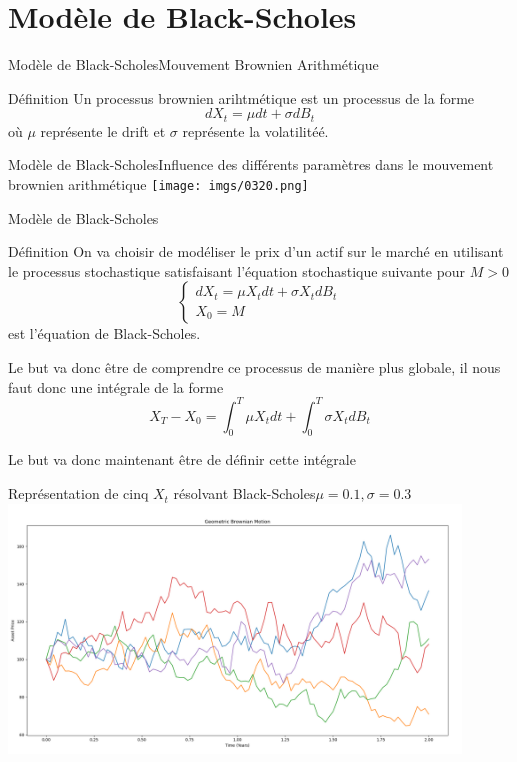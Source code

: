 \documentclass{beamer}
\newcommand{\1}{\mathmybb{1}}
\begin{document}
\section{Modèle de Black-Scholes}
\begin{frame}{Modèle de Black-Scholes}{Mouvement Brownien Arithmétique}
  \begin{block}{Définition}
    Un processus brownien arihtmétique est un processus de la forme
    \begin{equation}
      dX_{t} = \mu dt + \sigma dB_{t}
    \end{equation}
    où $\mu$ représente le drift et $\sigma$ représente la volatilitéé.
    \end{block}
  \end{frame}
  \begin{frame}{Modèle de Black-Scholes}{Influence des différents paramètres dans le mouvement brownien arithmétique}
    \texttt{[image: imgs/0320.png]}
  \end{frame}
\begin{frame}{Modèle de Black-Scholes}
  \begin{block}{Définition}
    On va choisir de modéliser le prix d'un actif sur le marché en utilisant le processus stochastique satisfaisant l'équation stochastique suivante pour $M > 0$
    \begin{equation}
      \begin{cases}
        dX_{t} = \mu X_{t} dt + \sigma X_{t} dB_{t} \\
        X_{0} = M
      \end{cases}
      \end{equation}
      est l'équation de Black-Scholes. \\
    \end{block}
    \pause
    \begin{alertblock}{}
    Le but va donc être de comprendre ce processus de manière plus globale, il nous faut donc une intégrale de la forme
    \[
      X_{T} - X_{0} = \int_0^{T} \mu X_{t} dt + \int_{0}^{T} \sigma X_{t} dB_{t}
    \]
  \end{alertblock}
  \pause
  Le but va donc maintenant être de définir cette intégrale
\end{frame}
 \begin{frame}{Représentation de cinq $X_{t}$ résolvant Black-Scholes}{$\mu =0.1, \sigma =0.3$}
   \includegraphics[width=12cm]{imgs/bs5.png}
 \end{frame}
\end{document}
